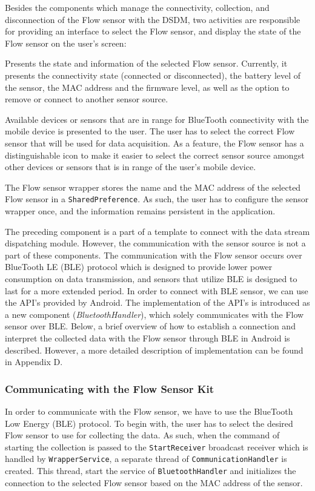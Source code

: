 Besides the components which manage the connectivity, collection, and disconnection of the Flow sensor with the DSDM, two activities are responsible for providing an interface to select the Flow sensor, and display the state of the Flow sensor on the user's screen:
\begin{description}[font=\normalfont\itshape]
    \item[MainActivity:] Presents the state and information of the selected Flow sensor. Currently, it presents the connectivity state (connected or disconnected), the battery level of the sensor, the MAC address and the firmware level, as well as the option to remove or connect to another sensor source. 
    \item[DeviceListActivity:] Available devices or sensors that are in range for BlueTooth connectivity with the mobile device is presented to the user. The user has to select the correct  Flow sensor that will be used for data acquisition.  As a feature, the Flow sensor has a distinguishable icon to make it easier to select the correct sensor source amongst other devices or sensors that is in range of the user's mobile device.
\end{description}
The Flow sensor wrapper stores the name and the MAC address of the selected Flow sensor in a \verb|SharedPreference|. As such, the user has to configure the sensor wrapper once, and the information remains persistent in the application.

The preceding component is a part of a template to connect with the data stream dispatching module. However, the communication with the sensor source is not a part of these components. The communication with the Flow sensor occurs over BlueTooth LE (BLE) protocol which is designed to provide lower power consumption on data transmission, and sensors that utilize BLE is designed to last for a more extended period. In order to connect with BLE sensor, we can use the API's provided by Android. The implementation of the API's is introduced as a new component (\textit{BluetoothHandler}), which solely communicates with the Flow sensor over BLE. Below, a brief overview of how to establish a connection and interpret the collected data with the Flow sensor through BLE in Android is described. However, a more detailed description of implementation can be found in Appendix D.


\subsubsection{Communicating with the Flow Sensor Kit}\label{imp:comflow}
In order to communicate with the Flow sensor, we have to use the BlueTooth Low Energy (BLE) protocol. To begin with, the user has to select the desired Flow sensor to use for collecting the data. As such, when the command of starting the collection is passed to the \verb|StartReceiver| broadcast receiver which is handled by \verb|WrapperService|, a separate thread of \verb|CommunicationHandler| is created. This thread, start the service of \verb|BluetoothHandler| and initializes the connection to the selected Flow sensor based on the MAC address of the sensor. 

